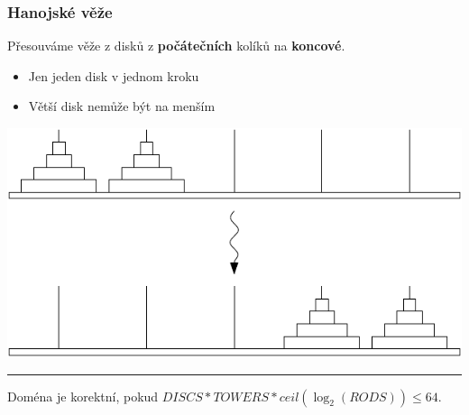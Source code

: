 \documentclass[usenames,dvipsnames,9pt]{beamer}
\begin{document}
\begin{frame}
  \frametitle{Hanojské věže}
  
  Přesouváme věže z disků z {\bf počátečních} kolíků na {\bf koncové}.
  
  \begin{itemize}
  \item Jen jeden disk v jednom kroku
  \item Větší disk nemůže být na menším
  \end{itemize}
  
  \vspace{1em}

\begin{center}
\includegraphics[width=0.5\linewidth]{08/figs/hanoi.pdf}
\end{center}

\vspace{1em}\hrule\vspace{1em}

\faWarning\hspace{3pt} Doména je korektní, pokud $DISCS*TOWERS*ceil(\log_2(RODS)) \leq 64$.

\end{frame}
\end{document}

